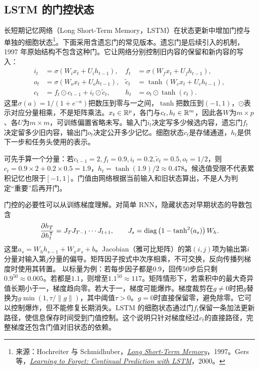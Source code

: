 \subsection{LSTM 的门控状态}
长短期记忆网络（Long Short-Term Memory，LSTM）在状态更新中增加门控与单独的细胞状态\footnote{来源：Hochreiter 与 Schmidhuber，\href{https://doi.org/10.1162/neco.1997.9.8.1735}{\textit{Long Short-Term Memory}}，1997。Gers 等，\href{https://doi.org/10.1162/089976600300015015}{\textit{Learning to Forget: Continual Prediction with LSTM}}，2000。}。下面采用含遗忘门的常见版本。遗忘门是后续引入的机制，1997 年原始结构不包含这种门。它让网络分别控制旧内容的保留和新内容的写入：
\begin{align}
 i_t&=\sigma(W_ix_t+U_ih_{t-1}),& f_t&=\sigma(W_fx_t+U_fh_{t-1}),\label{eq:sequence-lstm-input-forget}\\
 o_t&=\sigma(W_ox_t+U_oh_{t-1}),& \tilde c_t&=\tanh(W_cx_t+U_ch_{t-1}),\label{eq:sequence-lstm-output-candidate}\\
 c_t&=f_t\odot c_{t-1}+i_t\odot\tilde c_t,& h_t&=o_t\odot\tanh(c_t).
\end{align}
这里$\sigma(a)=1/(1+e^{-a})$把数压到零与一之间，$\tanh$把数压到$(-1,1)$，$\odot$表示对应分量相乘，不是矩阵乘法。$x_t\in\mathbb{R}^p$，各门与$c_t,h_t\in\mathbb{R}^m$，因此各$W$为$m\times p$、各$U$为$m\times m$，可训练偏置省略未写。输入门$i_t$决定写多少候选内容，遗忘门$f_t$决定留多少旧内容，输出门$o_t$决定公开多少记忆。细胞状态$c_t$是存储通道，$h_t$是供下一步和任务头使用的表示。

可先手算一个分量：若$c_{t-1}=2,f_t=0.9,i_t=0.2,\tilde c_t=0.5,o_t=1/2$，则$c_t=0.9\times2+0.2\times0.5=1.9$，$h_t=\tanh(1.9)/2\approx0.478$。候选值受限不代表累积记忆也限于$[-1,1]$。门值由网络根据当前输入和旧状态算出，不是人为判定“重要”后再开门。

门控的必要性可以从训练梯度理解。对简单 RNN，隐藏状态对早期状态的导数包含
\begin{equation}
 \frac{\partial h_T}{\partial h_t^{\mathsf T}}=J_TJ_{T-1}\cdots J_{t+1},\qquad
 J_s=\operatorname{diag}\left(1-\tanh^2(a_s)\right)W_h.
\end{equation}
这里$a_s=W_hh_{s-1}+W_xx_s+b$。Jacobian（雅可比矩阵）的第$(i,j)$项为输出第$i$分量对输入第$j$分量的偏导。矩阵因子按式中次序相乘，不可交换，反向传播列梯度时使用其转置。
以标量为例：若每步因子都是$0.9$，回传$50$步后只剩$0.9^{50}\approx0.005$。若都是$1.1$，则增至$1.1^{50}\approx117$。矩阵情形下，若乘积中的最大奇异值长期小于一，梯度趋向零。若大于一，梯度可能爆炸。梯度裁剪在$g\ne0$时把$g$替换为$g\min(1,\tau/\|g\|)$，其中阈值$\tau>0$。$g=0$时直接保留零，避免除零。它可以控制爆炸，但不能修复长期消失。LSTM 的细胞状态通过门$f_t$保留一条加法更新路径，使信息保存时间受到门值控制。这个说明只针对梯度经过$c_t$的直接路径，完整梯度还包含门值对旧状态的依赖。

